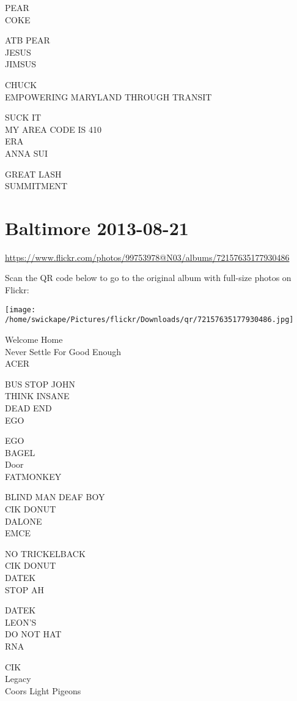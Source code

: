 \documentclass[10pt,letterpaper]{article}
\begin{document}
PEAR\\
COKE

ATB PEAR\\
JESUS\\
JIMSUS

CHUCK\\
EMPOWERING MARYLAND THROUGH TRANSIT

SUCK IT\\
MY AREA CODE IS 410\\
ERA\\
ANNA SUI

GREAT LASH\\
SUMMITMENT
\pagebreak

\section*{Baltimore 2013-08-21}

\url{https://www.flickr.com/photos/99753978@N03/albums/72157635177930486}

Scan the QR code below to go to the original album with full-size photos on Flickr:

\texttt{[image: /home/swickape/Pictures/flickr/Downloads/qr/72157635177930486.jpg]}
\pagebreak

Welcome Home\\
Never Settle For Good Enough\\
ACER

BUS STOP JOHN\\
THINK INSANE\\
DEAD END\\
EGO

EGO\\
BAGEL\\
Door\\
FATMONKEY

BLIND MAN DEAF BOY\\
CIK DONUT\\
DALONE\\
EMCE

NO TRICKELBACK\\
CIK DONUT\\
DATEK\\
STOP AH

DATEK\\
LEON'S\\
DO NOT HAT\\
RNA

CIK\\
Legacy\\
Coors Light Pigeons
\end{document}
